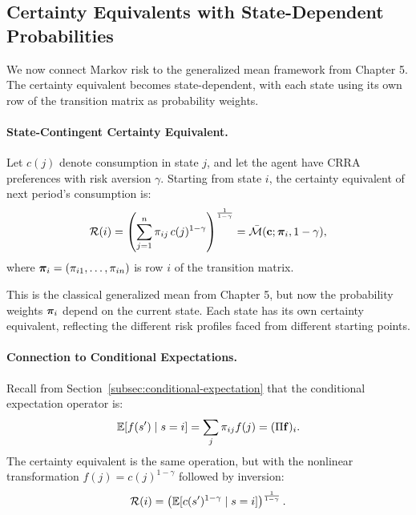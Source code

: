 \subsection{Certainty Equivalents with State-Dependent Probabilities}
\label{subsec:ce-markov}

We now connect Markov risk to the generalized mean framework from Chapter 5. The certainty equivalent becomes state-dependent, with each state using its own row of the transition matrix as probability weights.

\paragraph{State-Contingent Certainty Equivalent.}
Let $c(j)$ denote consumption in state $j$, and let the agent have CRRA preferences with risk aversion $\gamma$. Starting from state $i$, the certainty equivalent of next period's consumption is:
\begin{equation}
\mathcal{R}(i) = \left( \sum_{j=1}^{n} \pi_{ij} \, c(j)^{1-\gamma} \right)^{\frac{1}{1-\gamma}} = \bar{\mathcal{M}}(\mathbf{c}; \bm{\pi}_i, 1-\gamma),
\label{eq:ce-markov}
\end{equation}
where $\bm{\pi}_i = (\pi_{i1}, \ldots, \pi_{in})$ is row $i$ of the transition matrix.

This is the classical generalized mean from Chapter 5, but now the probability weights $\bm{\pi}_i$ depend on the current state. Each state has its own certainty equivalent, reflecting the different risk profiles faced from different starting points.

\paragraph{Connection to Conditional Expectations.}
Recall from Section~\ref{subsec:conditional-expectation} that the conditional expectation operator is:
\begin{equation}
\mathbb{E}[f(s') \mid s = i] = \sum_{j} \pi_{ij} f(j) = (\Pi \mathbf{f})_i.
\label{eq:conditional-expectation-recall}
\end{equation}
The certainty equivalent is the same operation, but with the nonlinear transformation $f(j) = c(j)^{1-\gamma}$ followed by inversion:
\begin{equation}
\mathcal{R}(i) = \left( \mathbb{E}[c(s')^{1-\gamma} \mid s = i] \right)^{\frac{1}{1-\gamma}}.
\label{eq:ce-as-conditional}
\end{equation}

